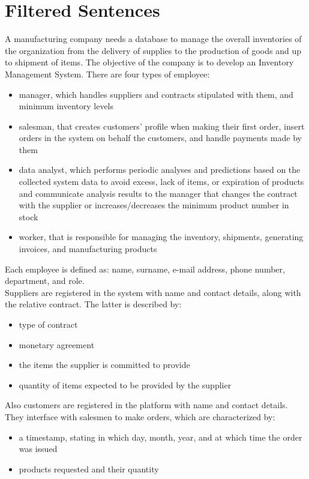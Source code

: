 \section{Filtered Sentences}

A manufacturing company needs a database to manage the overall inventories of the organization from the delivery of supplies to the production of goods and up to shipment of items. The objective of the company is to develop an Inventory Management System.
There are four types of employee:
\begin{itemize}
	\item manager, which handles suppliers and contracts stipulated with them, and minimum inventory levels
	\item salesman, that creates customers' profile when making their first order, insert orders in the system on behalf the customers, and handle payments made by them
	\item data analyst, which performs periodic analyses and predictions based on the collected system data to avoid excess, lack of items, or expiration of products and communicate analysis results to the manager that changes the contract with the supplier or increases/decreases the minimum product number in stock
	\item worker, that is responsible for managing the inventory, shipments, generating invoices, and manufacturing products
\end{itemize}
Each employee is defined as: name, surname, e-mail address, phone number, department, and role.\\
Suppliers are registered in the system with name and contact details, along with the relative contract. The latter is described by:
\begin{itemize}
	\item type of contract %
	\item monetary agreement
	\item the items the supplier is committed to provide
	\item quantity of items expected to be provided by the supplier
\end{itemize}
Also customers are registered in the platform with name and contact details. They interface with salesmen to make orders, which are characterized by:
\begin{itemize}
	\item a timestamp, stating in which day, month, year, and at which time the order was issued
	\item products requested and their quantity
\end{itemize}
